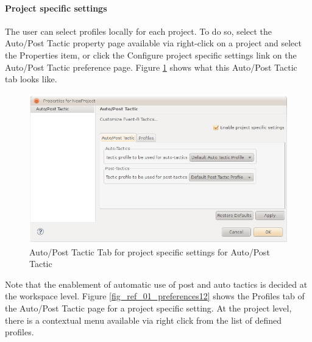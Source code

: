 \paragraph{Project specific settings}

The user can select profiles locally for each project. To do so, select the \textsf{Auto/Post Tactic} property page available via right-click on a project and select the  \textsf{Properties} item, or click the \textsf{Configure project specific settings link} on the \textsf{Auto/Post Tactic} preference page. Figure \ref{fig_ref_01_preferences11} shows what this \textsf{Auto/Post Tactic} tab looks like.

\begin{figure}[!ht]
\begin{center}
	\includegraphics{img/reference/ref_01_preferences11.png}
	\caption{Auto/Post Tactic Tab for project specific settings for Auto/Post Tactic}
	\label{fig_ref_01_preferences11}
\end{center}
\end{figure}

Note that the enablement of automatic use of post and auto tactics is decided at the workspace level. Figure \ref{fig_ref_01_preferences12} shows the Profiles tab of the \textsf{Auto/Post Tactic} page for a project specific setting. At the project level, there is a contextual menu available via right click from the list of defined profiles. 

